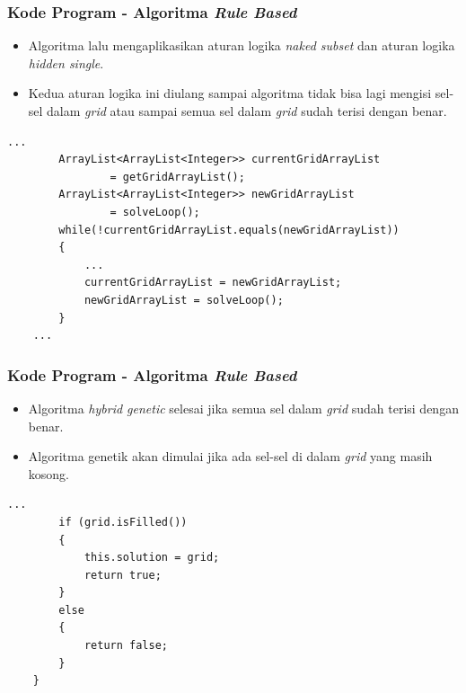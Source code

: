 \documentclass{beamer}
\begin{document}
\begin{frame}[fragile]
\frametitle{Kode Program - Algoritma \textit{Rule Based}}
\begin{itemize}
\item Algoritma lalu mengaplikasikan aturan logika \textit{naked subset} dan aturan logika \textit{hidden single}.
\item Kedua aturan logika ini diulang sampai algoritma tidak bisa lagi mengisi sel-sel dalam \textit{grid} atau sampai semua sel dalam \textit{grid} sudah terisi dengan benar.
\end{itemize}
\begin{lstlisting}[basicstyle=\tiny]
	...
        ArrayList<ArrayList<Integer>> currentGridArrayList 
                = getGridArrayList();
        ArrayList<ArrayList<Integer>> newGridArrayList 
                = solveLoop();
        while(!currentGridArrayList.equals(newGridArrayList))
        {
            ...
            currentGridArrayList = newGridArrayList;
            newGridArrayList = solveLoop();
        }
	...
\end{lstlisting}
\end{frame}


\begin{frame}[fragile]
\frametitle{Kode Program - Algoritma \textit{Rule Based}}
\begin{itemize}
\item Algoritma \textit{hybrid genetic} selesai jika semua sel dalam \textit{grid} sudah terisi dengan benar.
\item Algoritma genetik akan dimulai jika ada sel-sel di dalam \textit{grid} yang masih kosong.
\end{itemize}
\begin{lstlisting}[basicstyle=\tiny]
	...
        if (grid.isFilled())
        {
            this.solution = grid;
            return true;
        }
        else
        {
            return false;
        }
    }
\end{lstlisting}
\end{frame}

\end{document}
